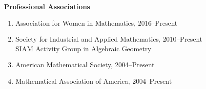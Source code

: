 \documentclass[12pt]{article}
\begin{document}


\textbf{Professional Associations}
\begin{enumerate}[revarabic,labelwidth=*]
\item Association for Women in Mathematics, 2016--Present
\item Society for Industrial and Applied Mathematics, 2010--Present \\ SIAM Activity Group in Algebraic Geometry
\item American Mathematical Society, 2004--Present
\item Mathematical Association of America, 2004--Present
\end{enumerate}


\end{document}
